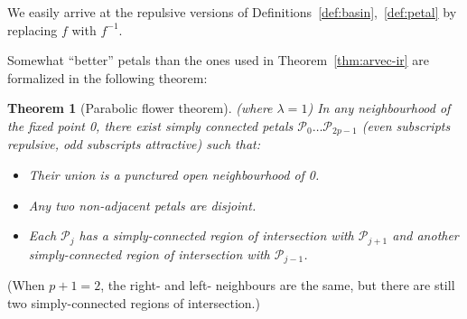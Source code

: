 \documentclass{article}
\newtheorem{thm}{Theorem}
\begin{document}
We easily arrive at the repulsive versions of Definitions~\ref{def:basin},~\ref{def:petal} by replacing $f$ with $f^{-1}$. 

Somewhat ``better'' petals than the ones used in Theorem~\ref{thm:arvec-ir} are formalized in the following theorem: 

\begin{thm}[Parabolic flower theorem]
    \label{thm:flower}
    (where $\lambda = 1$) In any neighbourhood of the fixed point 0, there exist simply connected petals $\mathcal{P}_{0}\dots\mathcal{P}_{2p-1}$ (even subscripts repulsive, odd subscripts attractive) such that:
    \begin{itemize}
        \item Their union is a punctured open neighbourhood of 0.
        \item Any two non-adjacent petals are disjoint.
        \item Each $\mathcal{P}_j$ has a simply-connected region of intersection with $\mathcal{P}_{j+1}$ and another simply-connected region of intersection with $\mathcal{P}_{j-1}$.
    \end{itemize}
\end{thm}
(When $p + 1 = 2$, the right- and left- neighbours are the same, but there are still two simply-connected regions of intersection.)
\end{document}
